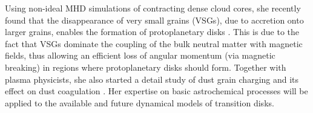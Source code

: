 \documentclass[10pt,fleqn,twoside]{article}
\begin{document}
Using non-ideal MHD simulations of contracting dense cloud cores, 
she recently found that the disappearance of very small grains (VSGs), 
due to accretion onto larger grains, enables the formation of 
protoplanetary disks \citep{2016MNRAS.460.2050Z}. This is due to the fact 
that VSGs dominate the coupling of the bulk neutral matter with magnetic 
fields, thus allowing an efficient loss of angular momentum (via magnetic 
breaking) in regions where protoplanetary disks should form. Together 
with plasma physicists, she also started a detail study of dust grain 
charging and its effect on dust coagulation \citep{2015ApJ...812..135I}.
Her expertise on basic astrochemical
processes will be applied to the available and future dynamical models
of transition disks. \\
\end{document}
